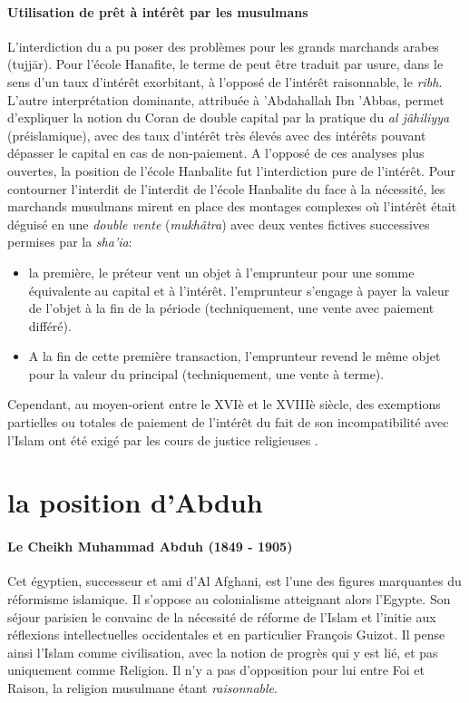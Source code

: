 \paragraph{Utilisation de prêt à intérêt par les musulmans} L'interdiction du {\riba} a pu poser des problèmes pour les grands marchands arabes (tujjār).  
Pour l'école Hanafite, le terme de \riba peut être traduit par usure, dans le sens d'un taux d'intérêt exorbitant, à l'opposé de l'intérêt raisonnable, le \emph{ribh}. L'autre interprétation dominante, attribuée à 'Abdahallah Ibn 'Abbas, permet d'expliquer la notion du Coran de double capital par la pratique du \textit{\riba al jâhiliyya} (préislamique), avec des taux d'intérêt très élevés avec des intérêts pouvant dépasser le capital en cas de non-paiement. A l'opposé de ces analyses plus ouvertes, la position de l'école Hanbalite fut l'interdiction pure de l'intérêt. Pour contourner l'interdit de l'interdit de l'école Hanbalite du \riba face à la nécessité, les marchands musulmans mirent en place des montages complexes où l'intérêt était déguisé en une \textit{double vente} (\emph{mukhâtra}) avec deux ventes fictives successives permises par la \textit{sha'ia}: 
\begin{itemize}
    \item la première, le préteur vent un objet à l'emprunteur pour une somme équivalente au capital et à l'intérêt. l'emprunteur s'engage à payer la valeur de l'objet à la fin de la période (techniquement, une vente avec paiement différé). 
    \item A la fin de cette première transaction, l'emprunteur revend le même objet pour la valeur du principal (techniquement, une vente à terme).
\end{itemize}
 Cependant,  au moyen-orient entre le XVIè et le XVIIIè siècle, des exemptions partielles ou totales de paiement de l'intérêt du fait de son incompatibilité avec l'Islam ont été exigé par les cours de justice religieuses .
 


\section{la position d'Abduh}
\paragraph{Le Cheikh {Muhammad Abduh} (1849 - 1905)} Cet égyptien, successeur et ami d'Al Afghani, est l'une des figures marquantes du réformisme islamique. Il s'oppose au colonialisme atteignant alors l'Egypte. Son séjour  parisien le convainc de la nécessité de réforme de l'Islam et l'initie aux réflexions intellectuelles occidentales et en particulier François Guizot. Il pense ainsi l'Islam comme civilisation, avec la notion de progrès qui y est lié, et pas uniquement comme Religion. Il n'y a pas d'opposition pour lui entre Foi et Raison, la religion musulmane étant \textit{raisonnable}.   

